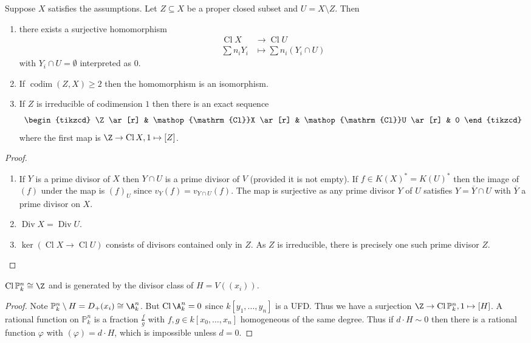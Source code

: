 \documentclass[a4paper]{article}
\renewcommand*{\P}{\mathbb{P}}
\DeclareMathOperator{\codim}{codim} %
\DeclareMathOperator{\Div}{Div} %
\DeclareMathOperator{\Cl}{Cl} %
\begin{document}
\begin{proposition}
  Suppose \(X\) satisfies the assumptions. Let \(Z \subseteq X\) be a proper closed subset and \(U = X \setminus Z\). Then
  \begin{enumerate}
  \item there exists a surjective homomorphism
    \begin{align*}
      \Cl X &\to \Cl U \\
      \sum n_i Y_i &\mapsto \sum n_i (Y_i \cap U)
    \end{align*}
    with \(Y_i \cap U = \emptyset\) interpreted as \(0\).
  \item If \(\codim(Z, X) \geq 2\) then the homomorphism is an isomorphism.
  \item If \(Z\) is irreducible of codimension \(1\) then there is an exact sequence
    \[
      \begin{tikzcd}
        \Z \ar[r] & \Cl X \ar[r] & \Cl U \ar[r] & 0
      \end{tikzcd}
    \]
    where the first map is \(\Z \to \Cl X, 1 \mapsto [Z]\).
  \end{enumerate}
\end{proposition}

\begin{proof}\leavevmode
  \begin{enumerate}
  \item If \(Y\) is a prime divisor of \(X\) then \(Y \cap U\) is a prime divisor of \(V\) (provided it is not empty). If \(f \in K(X)^* = K(U)^*\) then the image of \((f)\) under the map is \((f)_U\) since \(v_Y(f) = v_{Y \cap U}(f)\). The map is surjective as any prime divisor \(Y\) of \(U\) satisfies \(Y = \overline Y \cap U\) with \(\overline Y\) a prime divisor on \(X\).
  \item \(\Div X = \Div U\).
  \item \(\ker (\Cl X \to \Cl U)\) consists of divisors contained only in \(Z\). As \(Z\) is irreducible, there is precisely one such prime divisor \(Z\).
  \end{enumerate}
\end{proof}

\begin{proposition}
  \(\Cl \P_k^n \cong \Z\) and is generated by the divisor class of \(H = V((x_i))\).
\end{proposition}

\begin{proof}
  Note \(\P^n_k \setminus H = D_+(x_i) \cong \A^n_k\). But \(\Cl \A_k^n = 0\) since \(k[y_1, \dots, y_n]\) is a UFD. Thus we have a surjection \(\Z \to \Cl \P_k^n, 1 \mapsto [H]\). A rational function on \(\P^n_k\) is a fraction \(\frac{f}{g}\) with \(f, g \in k[x_0, \dots, x_n]\) homogeneous of the same degree. Thus if \(d \cdot H \sim 0\) then there is a rational function \(\varphi\) with \((\varphi) = d \cdot H\), which is impossible unless \(d = 0\).
\end{proof}
\end{document}
